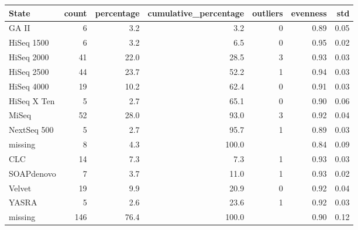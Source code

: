 \begin{table}[ht]
\centering
\begin{tabular}{lrrrrrr}
  \hline
State & count & percentage & cumulative\_percentage & outliers & evenness & std \\ 
  \hline
GA II & 6 & 3.2 & 3.2 & 0 & 0.89 & 0.05 \\ 
  HiSeq 1500 & 6 & 3.2 & 6.5 & 0 & 0.95 & 0.02 \\ 
  HiSeq 2000 & 41 & 22.0 & 28.5 & 3 & 0.93 & 0.03 \\ 
  HiSeq 2500 & 44 & 23.7 & 52.2 & 1 & 0.94 & 0.03 \\ 
  HiSeq 4000 & 19 & 10.2 & 62.4 & 0 & 0.91 & 0.03 \\ 
  HiSeq X Ten & 5 & 2.7 & 65.1 & 0 & 0.90 & 0.06 \\ 
  MiSeq & 52 & 28.0 & 93.0 & 3 & 0.92 & 0.04 \\ 
  NextSeq 500 & 5 & 2.7 & 95.7 & 1 & 0.89 & 0.03 \\ 
  missing & 8 & 4.3 & 100.0 &  & 0.84 & 0.09 \\ 
  CLC & 14 & 7.3 & 7.3 & 1 & 0.93 & 0.03 \\ 
  SOAPdenovo & 7 & 3.7 & 11.0 & 1 & 0.93 & 0.02 \\ 
  Velvet & 19 & 9.9 & 20.9 & 0 & 0.92 & 0.04 \\ 
  YASRA & 5 & 2.6 & 23.6 & 1 & 0.92 & 0.03 \\ 
  missing & 146 & 76.4 & 100.0 &  & 0.90 & 0.12 \\ 
   \hline
\end{tabular}
\end{table}
